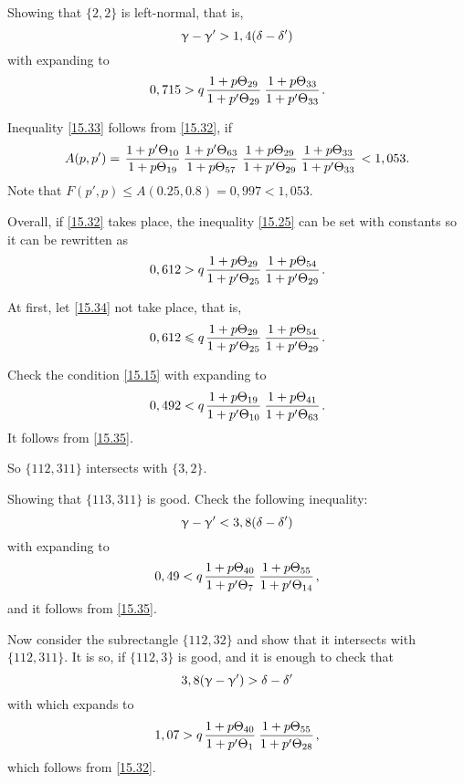 Showing that $\{2, 2\}$ is left-normal, that is,
\begin{equation}
	\upgamma - \upgamma' > 1,4 (\delta - \delta')
\end{equation}
with
expanding to
\begin{equation}\label{15.33}
	0,715 > q \up{29}{29} \up{33}{33}.
\end{equation}

Inequality \ref{15.33} follows from \ref{15.32}, if
\begin{equation}
	A(p, p') = \pu{10}{19} \pu{63}{57} \up{29}{29} \up{33}{33} < 1,053.
\end{equation}
Note that $F(p', p) \leqslant A(0.25, 0.8) = 0,997 < 1,053$.

Overall, if \ref{15.32} takes place, the inequality \ref{15.25} can be set with constants
so it can be rewritten as
\begin{equation}\label{15.34}
	0,612 > q \up{29}{25} \up{54}{29}.
\end{equation}

At first, let \ref{15.34} not take place, that is,
\begin{equation}\label{15.35}
	0,612 \leqslant q \up{29}{25} \up{54}{29}.
\end{equation}

Check the condition \ref{15.15} with
expanding to
\begin{equation}\label{15.36}
	0,492 < q \up{19}{10} \up{41}{63}.
\end{equation}
It follows from \ref{15.35}.

So $\{112, 311\}$ intersects with $\{3, 2\}$.

Showing that $\{113, 311\}$ is good.
Check the following inequality:
\begin{equation}
	\upgamma - \upgamma' < 3,8 (\delta - \delta')
\end{equation}
with
expanding to
\begin{equation}
	0,49 < q \up{40}{7} \up{55}{14},
\end{equation}
and it follows from \ref{15.35}.

Now consider the subrectangle $\{112, 32\}$ and show that it intersects with $\{112, 311\}$.
It is so, if $\{112, 3\}$ is good, and it is enough to check that
\begin{equation*}
	3,8 (\upgamma - \upgamma') > \delta - \delta'
\end{equation*}
with
which expands to
\begin{equation*}
	1,07 > q \up{40}{1} \up{55}{28},
\end{equation*}
which follows from \ref{15.32}.

